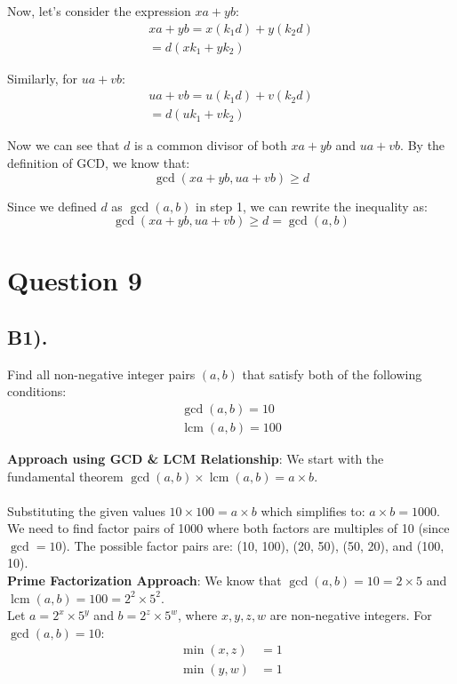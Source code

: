 \documentclass[12pt]{article}
\begin{document}
Now, let's consider the expression $xa + yb$:
\begin{gather*}
    xa + yb = x(k_1d) + y(k_2d) \\
            = d(xk_1 + yk_2)
\end{gather*}

Similarly, for $ua + vb$:
\begin{gather*}
    ua + vb = u(k_1d) + v(k_2d) \\
            = d(uk_1 + vk_2)
\end{gather*}

Now we can see that $d$ is a common divisor of both $xa + yb$ and $ua + vb$.
By the definition of GCD, we know that:
\[
    \gcd(xa+yb, ua+vb) \geq d
\]

Since we defined $d$ as $\gcd(a,b)$ in step 1, we can rewrite the inequality as:
\[
    \gcd(xa+yb, ua+vb) \geq d = \gcd(a,b)
\]

\section*{Question 9}
\subsection*{B1).}

Find all non-negative integer pairs $(a, b)$ that satisfy both of the following conditions:
\begin{gather*}
    \gcd(a, b) = 10 \\
    \operatorname{lcm}(a, b) = 100
\end{gather*}

\textbf{Approach using GCD \& LCM Relationship}: We start with the fundamental theorem $\gcd(a, b) \times \operatorname{lcm}(a, b) = a \times b$. \\ \\
Substituting the given values $10 \times 100 = a \times b$ which simplifies to: $a \times b = 1000$.
We need to find factor pairs of 1000 where both factors are multiples of 10 (since $\gcd = 10$).
The possible factor pairs are: (10, 100), (20, 50), (50, 20), and (100, 10). \\

\textbf{Prime Factorization Approach}: We know that $\gcd(a, b) = 10 = 2 \times 5$ and $\operatorname{lcm}(a, b) = 100 = 2^2 \times 5^2$. \\

Let $a = 2^x \times 5^y$ and $b = 2^z \times 5^w$, where $x, y, z, w$ are non-negative integers.
For $\gcd(a, b) = 10$:
\begin{align*}
    \min(x, z) &= 1 \\
    \min(y, w) &= 1
\end{align*}
\end{document}
